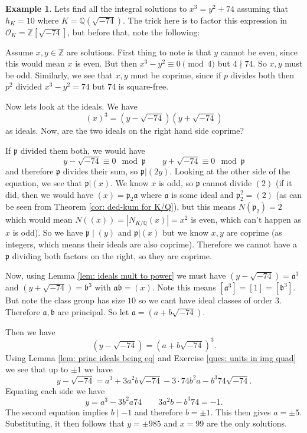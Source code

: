 \documentclass[11pt,a4paper]{report}
\theoremstyle{plain}
\theoremstyle{definition}
\newtheorem{exmp}[subsection]{Example}
\theoremstyle{definition}
\newcommand{\ZZ}{\mathbb{Z}}
\def\QQ{\mathbb{Q}}
\def\gothb{\mathfrak{b}}
\def\gothp{\mathfrak{p}}
\def \OO {\mathcal{O}}
\def\gotha{\mathfrak{a}}
\begin{document}
\begin{exmp}
	Lets find all the integral solutions to $x^3=y^2+74$ assuming that $h_K=10$ where $K=\QQ(\sqrt{-74})$. The trick here is to factor this expression in $\OO_K=\ZZ[\sqrt{-74}]$, but before that, note the following: 
	
	Assume $x,y \in \ZZ$ are solutions. First thing to note is that $y$ cannot be even, since this would mean $x$ is even. But then $x^3 -y^2 \equiv 0 \pmod 4$ but $4\nmid 74$. So $x,y$ must be odd. Similarly, we see that $x,y$ must be coprime, since if $p$ divides both then $p^2$ divided $x^3-y^2=74$ but $74$ is square-free. 
	
	
	Now lets look at the ideals.  We have \[(x)^3=(y-\sqrt{-74})(y+\sqrt{-74})\] as ideals. Now, are the two ideals on the right hand side coprime?
	
	If $\gothp$ divided them both, we would have \[y-\sqrt{-74} \equiv 0 \mod \gothp \qquad y+\sqrt{-74} \equiv 0 \mod \gothp \] and therefore $\gothp$ divides their sum, so $\gothp| (2y)$. Looking at the other side of the equation, we see that $\gothp|(x)$. We know $x$ is odd, so $\gothp$ cannot divide $(2)$ (if it did, then we would have $(x)=\gothp_2 \gotha$ where $\gotha$ is some ideal and $\gothp_2^2=(2)$ (as can be seen from Theorem \ref{cor: ded-kum for K/Q}), but this means $N(\gothp_2)=2$ which would mean $N((x))=|N_{K/\QQ}(x)|=x^2$ is even, which can't happen as $x$ is odd). So we have $\gothp \mid (y)$ and $\gothp|(x)$ but we know $x,y$ are coprime (as integers, which means their ideals are also coprime). Therefore we cannot have a $\gothp$ dividing both factors on the right, so they are coprime. 
	
	
	
	
	Now, using Lemma \ref{lem: ideals mult to power} we must have $(y-\sqrt{-74})=\gotha^3$ and $(y+\sqrt{-74})=\gothb^3$ with $\gotha\gothb=(x)$. Note this means $[\gotha^3]=[1]=[\gothb^3]$. But note the class group has size $10$ so we cant have ideal classes of order $3$. Therefore $\gotha,\gothb$ are principal. So let $\gotha=(a+b\sqrt{-74})$.
	
	Then we have \[(y-\sqrt{-74})=(a+b\sqrt{-74})^3.\] Using Lemma \ref{lem: princ ideals being eq} and Exercise \ref{ques: units in img quad} we see that up to $\pm 1$ we have \[y-\sqrt{-74}=a^3+3a^2b\sqrt{-74}-3\cdot 74b^2a-b^3 74 \sqrt{-74}.\] Equating each side we have \[y=a^3-3b^2a74 \qquad 3a^2b-b^3 74=-1.\] The second equation implies $b \mid -1$ and therefore $b=\pm 1$. This then gives $a=\pm 5$. Substituting,  it then follows that $y=\pm 985$ and $x=99$ are the only solutions.
	
\end{exmp}
\end{document}
